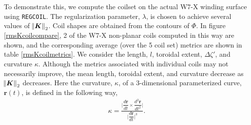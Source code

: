 \documentclass[aps,unsortedaddress]{revtex4-1}
\newcommand{\der}[2]{\dfrac{d #1}{d  #2}}
\begin{document}
To demonstrate this, we compute the coilset on the actual W7-X winding surface using \texttt{REGCOIL}. The regularization parameter, $\lambda$, is chosen to achieve several values of $\norm{\bm{K}}_2$. Coil shapes are obtained from the contours of $\Phi$. In figure \ref{rmsKcoilcompare}, 2 of the W7-X non-planar coils computed in this way are shown, and the corresponding average (over the 5 coil set) metrics are shown in table \ref{rmsKcoilmetrics}. We consider the length, $l$, toroidal extent, $\Delta \zeta'$, and curvature $\kappa$. Although the metrics associated with individual coils may not necessarily improve, the mean length, toroidal extent, and curvature decrease as $\norm{\bm{K}}_2$ decreases. Here the curvature, $\kappa$, of a 3-dimensional parameterized curve, $\bm{r}(t)$, is defined in the following way,
\begin{gather}
\kappa = \frac{\bigg \rvert \der{\bm{r}}{t} \times \der{^2 \bm{r}}{t^2} \bigg \rvert}{\bigg \rvert \der{\bm{r}}{t} \bigg \rvert^3}.
\end{gather}
\end{document}
